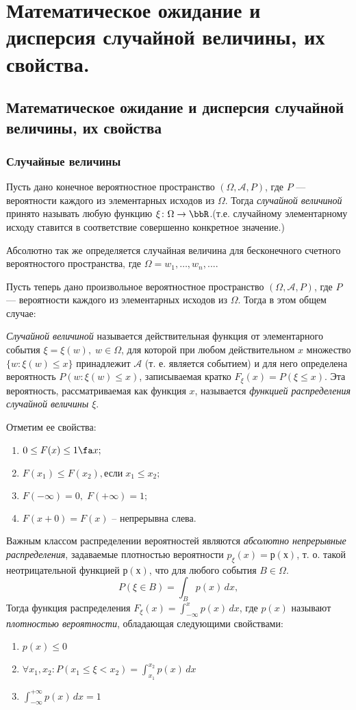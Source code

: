 \chapter{Математическое ожидание и дисперсия случайной величины, их свойства.}
\section{Математическое ожидание и дисперсия случайной величины, их свойства}

\subsection{Случайные величины}

Пусть дано конечное вероятностное пространство $(\Omega,\mathcal A, P)$, где $P$ --- вероятности каждого из элементарных исходов из $\Omega$. Тогда \textit{случайной величиной} принято называть любую функцию $\xi\colon \Omega \to \bbR$.(т.е. случайному элементарному исходу ставится в соответствие совершенно конкретное значение.)

Абсолютно так же определяется случайная величина для бесконечного счетного вероятностого пространства, где $\Omega = {w_1,\dots, w_n,...}$.

Пусть теперь дано произвольное вероятностное пространство $(\Omega,\mathcal A, P)$, где $P$ --- вероятности каждого из элементарных исходов из $\Omega$. Тогда в этом общем случае:
\begin{defn}
\textit{Случайной величиной} называется действительная функция от элементарного события $\xi = \xi(w), \; w\in\Omega$, для которой при любом действительном $x$ множество $\{w: \xi(w) \le x\}$ принадлежит $\mathcal A$ (т. е. является событием) и для него определена вероятность $P(w: \xi(w) \le x)$, записываемая кратко $F_\xi(x)=P(\xi \le x)$. Эта вероятность, рассматриваемая как функция $x$, называется \textit{функцией распределения случайной величины $\xi$}.
\end{defn}
Отметим ее свойства:
\begin{enumerate}
\item 
$0 \le F(x) \le 1 \fa x;$ 
\item
$F(x_1) \le F(x_2), \text{если}\; x_1\le x_2;$
\item
$F(-\infty)=0, \; F(+\infty)=1;$
\item
$F(x+0)=F(x)$ -- непрерывна слева.
\end{enumerate}
Важным классом распределении вероятностей являются \textit{абсолютно непрерывные распределения}, задаваемые плотностью вероятности $p_\xi(x) = р(х)$, т. о. такой неотрицательной функцией $р(х)$, что для любого события $B\in\Omega$.
$$
P(\xi \in B)=\int_B p(x)\,dx,
$$
Тогда функция распределения $F_\xi(x)=\int_{-\infty}^{x}p(x)\,dx$, где $p(x)$ называют \textit{плотностью вероятности}, обладающая следующими свойствами:
\begin{enumerate}
\item 
$p(x)\le 0$
\item 
$\forall x_1,x_2: P(x_1\le\xi<x_2)=\int_{x_1}^{x_2}p(x)\,dx$
\item
$\int_{-\infty}^{+\infty}p(x)\,dx=1$
\end{enumerate}

